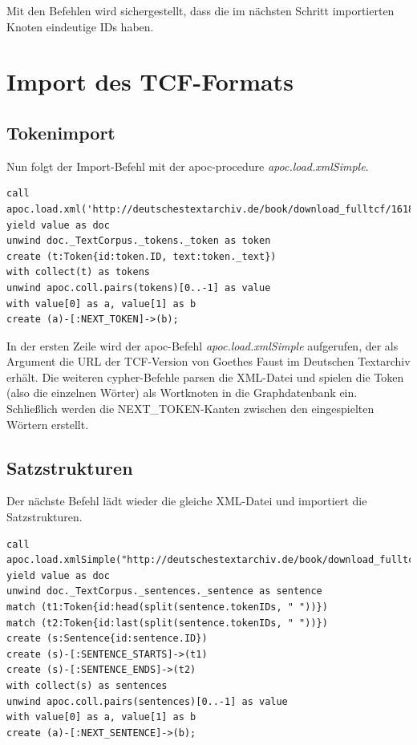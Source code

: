 \documentclass[ngerman,]{scrreprt}
\begin{document}
Mit den Befehlen wird sichergestellt, dass die im nächsten Schritt importierten Knoten eindeutige IDs haben.

\section{Import des TCF-Formats}\label{import-des-tcf-formats}

\subsection{Tokenimport}\label{tokenimport}

Nun folgt der Import-Befehl mit der apoc-procedure \emph{apoc.load.xmlSimple}.

\begin{verbatim}
call apoc.load.xml('http://deutschestextarchiv.de/book/download_fulltcf/16181') yield value as doc
unwind doc._TextCorpus._tokens._token as token
create (t:Token{id:token.ID, text:token._text})
with collect(t) as tokens
unwind apoc.coll.pairs(tokens)[0..-1] as value
with value[0] as a, value[1] as b
create (a)-[:NEXT_TOKEN]->(b);
\end{verbatim}

In der ersten Zeile wird der apoc-Befehl \emph{apoc.load.xmlSimple} aufgerufen, der als Argument die URL der TCF-Version von Goethes Faust im Deutschen Textarchiv erhält. Die weiteren cypher-Befehle parsen die XML-Datei und spielen die Token (also die einzelnen Wörter) als Wortknoten in die Graphdatenbank ein. Schließlich werden die NEXT\_TOKEN-Kanten zwischen den eingespielten Wörtern erstellt.

\subsection{Satzstrukturen}\label{satzstrukturen}

Der nächste Befehl lädt wieder die gleiche XML-Datei und importiert die Satzstrukturen.

\begin{verbatim}
call apoc.load.xmlSimple("http://deutschestextarchiv.de/book/download_fulltcf/16181") yield value as doc
unwind doc._TextCorpus._sentences._sentence as sentence
match (t1:Token{id:head(split(sentence.tokenIDs, " "))})
match (t2:Token{id:last(split(sentence.tokenIDs, " "))})
create (s:Sentence{id:sentence.ID})
create (s)-[:SENTENCE_STARTS]->(t1)
create (s)-[:SENTENCE_ENDS]->(t2)
with collect(s) as sentences
unwind apoc.coll.pairs(sentences)[0..-1] as value
with value[0] as a, value[1] as b
create (a)-[:NEXT_SENTENCE]->(b);
\end{verbatim}
\end{document}
